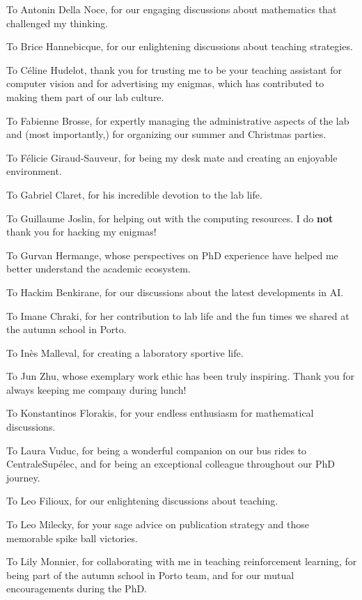 
To Antonin Della Noce, for our engaging discussions about mathematics that challenged my thinking.

To Brice Hannebicque, for our enlightening discussions about teaching strategies.

To Céline Hudelot, thank you for trusting me to be your teaching assistant for computer vision and for advertising my enigmas, which has contributed to making them part of our lab culture.

To Fabienne Brosse, for expertly managing the administrative aspects of the lab and (most importantly,) for organizing our summer and Christmas parties.

To Félicie Giraud-Sauveur, for being my desk mate and creating an enjoyable environment.

To Gabriel Claret, for his incredible devotion to the lab life.

To Guillaume Joslin, for helping out with the computing resources.
I do \textbf{not} thank you for hacking my enigmas!

To Gurvan Hermange, whose perspectives on PhD experience have helped me better understand the academic ecosystem.

To Hackim Benkirane, for our discussions about the latest developments in AI.

To Imane Chraki, for her contribution to lab life and the fun times we shared at the autumn school in Porto.

To Inès Malleval, for creating a laboratory sportive life.

To Jun Zhu, whose exemplary work ethic has been truly inspiring.
Thank you for always keeping me company during lunch!

To Konstantinos Florakis, for your endless enthusiasm for mathematical discussions.

To Laura Vuduc, for being a wonderful companion on our bus rides to CentraleSupélec, and for being an exceptional colleague throughout our PhD journey.

To Leo Filioux, for our enlightening discussions about teaching.

To Leo Milecky, for your sage advice on publication strategy and those memorable spike ball victories.

To Lily Monnier, for collaborating with me in teaching reinforcement learning, for being part of the autumn school in Porto team, and for our mutual encouragements during the PhD.

